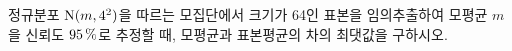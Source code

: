 정규분포 $\mathrm{N}(m{,}\mkern3mu\mathopen{}4^2)$을 따르는 모집단에서 크기가 64인 표본을 임의추출하여 모평균 $m$을 신뢰도 $95\mkern3mu \%$로 추정할 때, 모평균과 표본평균의 차의 최댓값을 구하시오. 

